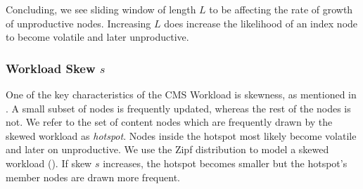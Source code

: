 \documentclass[abstracton,12pt]{scrartcl}
\theoremstyle{definition}
\begin{document}
Concluding, we see sliding window of length $L$ to be affecting the rate of growth of
unproductive nodes.
Increasing $L$ does increase the likelihood of an index node to become volatile
and later unproductive.

\subsubsection{Workload Skew $s$}

\label{sec:skew}

One of the key characteristics of the CMS Workload is skewness, as mentioned in 
. A small subset of nodes is frequently updated,
whereas the rest of the nodes is not. We refer to the set of content nodes
which are frequently drawn by the skewed workload as \textit{hotspot}.
Nodes inside the hotspot most likely become volatile and later on unproductive.
We use the Zipf distribution to model a skewed workload ().
If skew $s$ increases, the hotspot becomes smaller 
but the hotspot's member nodes are drawn more frequent.
\end{document}
